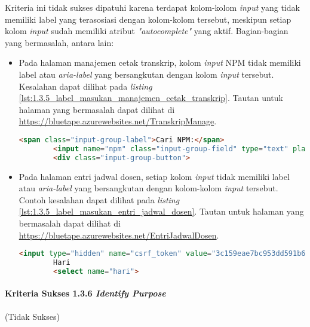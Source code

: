 Kriteria ini tidak sukses dipatuhi karena terdapat kolom-kolom \textit{input} yang tidak memiliki label yang terasosiasi dengan kolom-kolom tersebut, meskipun setiap kolom \textit{input} sudah memiliki atribut \textit{"autocomplete"} yang aktif. Bagian-bagian yang bermasalah, antara lain:
\begin{itemize}
    \item Pada halaman manajemen cetak transkrip, kolom \textit{input} NPM tidak memiliki label atau \textit{aria-label} yang bersangkutan dengan kolom \textit{input} tersebut. Kesalahan dapat dilihat pada \textit{listing} \ref{lst:1.3.5_label_masukan_manajemen_cetak_transkrip}. Tautan untuk halaman yang bermasalah dapat dilihat di \url{https://bluetape.azurewebsites.net/TranskripManage}.
    \begin{lstlisting}[frame=single, label={lst:1.3.5_label_masukan_manajemen_cetak_transkrip}, language=HTML, caption=Pelanggaran Kriteria Sukses 1.3.5 pada Halaman Manajemen Cetak Transkrip]
        <span class="input-group-label">Cari NPM:</span>
        <input name="npm" class="input-group-field" type="text" placeholder="2013730013" maxlength="10" minlength="10"/>
        <div class="input-group-button">
    \end{lstlisting}
    
    \item Pada halaman entri jadwal dosen, setiap kolom \textit{input} tidak memiliki label atau \textit{aria-label} yang bersangkutan dengan kolom-kolom \textit{input} tersebut. Contoh kesalahan dapat dilihat pada \textit{listing} \ref{lst:1.3.5_label_masukan_entri_jadwal_dosen}. Tautan untuk halaman yang bermasalah dapat dilihat di \url{https://bluetape.azurewebsites.net/EntriJadwalDosen}.
    \begin{lstlisting}[frame=single, label={lst:1.3.5_label_masukan_entri_jadwal_dosen}, language=HTML, caption=Pelanggaran Kriteria Sukses 1.3.5 pada Halaman Entri Jadwal Dosen]
        <input type="hidden" name="csrf_token" value="3c159eae7bc953dd591b679c080ed066" />
        Hari
        <select name="hari">
    \end{lstlisting}
\end{itemize}

\paragraph{Kriteria Sukses 1.3.6 \textit{Identify Purpose}}
\label{par:kepatuhan_bluetape_kriteria_sukses_1.3.6}
(Tidak Sukses)\\

